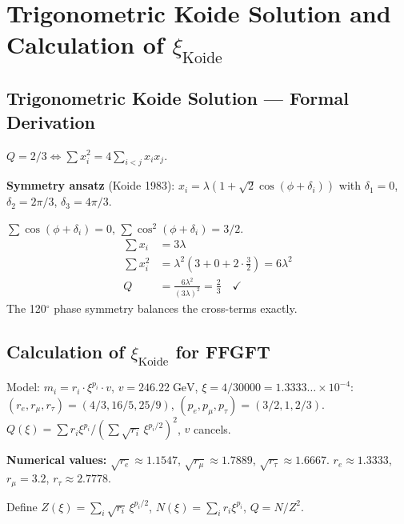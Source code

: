 \section{Trigonometric Koide Solution and Calculation of $\xi_{\text{Koide}}$}


\subsection{Trigonometric Koide Solution --- Formal Derivation}

$Q=2/3 \Leftrightarrow \sum x_i^2=4\sum_{i<j}x_ix_j$.

\textbf{Symmetry ansatz} (Koide 1983):
$x_i=\lambda(1+\sqrt{2}\cos(\phi+\delta_i))$
with $\delta_1=0$, $\delta_2=2\pi/3$, $\delta_3=4\pi/3$.

$\sum\cos(\phi+\delta_i)=0$, $\sum\cos^2(\phi+\delta_i)=3/2$.
\begin{align*}
  \sum x_i &= 3\lambda \\
  \sum x_i^2 &= \lambda^2(3+0+2\cdot\tfrac{3}{2}) = 6\lambda^2 \\
  Q &= \frac{6\lambda^2}{(3\lambda)^2} = \frac{2}{3} \quad\checkmark
\end{align*}
The 120$^\circ$ phase symmetry balances the cross-terms exactly.

\subsection{Calculation of $\xi_{\text{Koide}}$ for FFGFT}

Model: $m_i=r_i\cdot\xi^{p_i}\cdot v$, $v=246.22\;\text{GeV}$,
$\xi=4/30000=1.3333\ldots\times10^{-4}$:
$(r_e,r_\mu,r_\tau)=(4/3,16/5,25/9)$, $(p_e,p_\mu,p_\tau)=(3/2,1,2/3)$.
$Q(\xi)=\sum r_i\xi^{p_i}/(\sum\sqrt{r_i}\,\xi^{p_i/2})^2$, $v$ cancels.

\textbf{Numerical values:}
$\sqrt{r_e}\approx1.1547$, $\sqrt{r_\mu}\approx1.7889$, $\sqrt{r_\tau}\approx1.6667$.
$r_e\approx1.3333$, $r_\mu=3.2$, $r_\tau\approx2.7778$.

Define $Z(\xi)=\sum_i\sqrt{r_i}\,\xi^{p_i/2}$,
$N(\xi)=\sum_ir_i\xi^{p_i}$, $Q=N/Z^2$.

